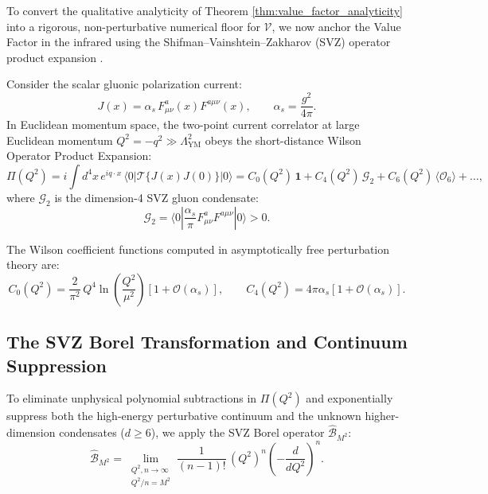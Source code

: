 To convert the qualitative analyticity of Theorem \ref{thm:value_factor_analyticity} into a rigorous, non-perturbative numerical floor for $\mathcal{V}$, we now anchor the Value Factor in the infrared using the Shifman--Vainshtein--Zakharov (SVZ) operator product expansion \cite{ShifmanVainshteinZakharov1979}.

Consider the scalar gluonic polarization current:
\begin{equation}
\label{eq:ch9_gluon_current}
J(x) = \alpha_s \, F_{\mu\nu}^a(x) F^{a\mu\nu}(x), \qquad \alpha_s = \frac{g^2}{4\pi}.
\end{equation}
In Euclidean momentum space, the two-point current correlator at large Euclidean momentum $Q^2 = -q^2 \gg \Lambda_{\mathrm{YM}}^2$ obeys the short-distance Wilson Operator Product Expansion:
\begin{equation}
\label{eq:ch9_ope_expansion}
\Pi(Q^2) = i \int d^4x \, e^{i q \cdot x} \, \langle 0 | \mathcal{T}\{ J(x) J(0) \} | 0 \rangle = C_0(Q^2) \, \mathbf{1} + C_4(Q^2) \, \mathcal{G}_2 + C_6(Q^2) \, \langle \mathcal{O}_6 \rangle + \dots,
\end{equation}
where $\mathcal{G}_2$ is the dimension-4 SVZ gluon condensate:
\begin{equation}
\label{eq:ch9_gluon_condensate_def}
\mathcal{G}_2 = \langle 0 | \frac{\alpha_s}{\pi} F_{\mu\nu}^a F^{a\mu\nu} | 0 \rangle > 0.
\end{equation}

The Wilson coefficient functions computed in asymptotically free perturbation theory are:
\begin{equation}
C_0(Q^2) = \frac{2}{\pi^2} \, Q^4 \ln\left(\frac{Q^2}{\mu^2}\right) \left[ 1 + \mathcal{O}(\alpha_s) \right], \qquad C_4(Q^2) = 4\pi \alpha_s \left[ 1 + \mathcal{O}(\alpha_s) \right].
\end{equation}

\subsection{The SVZ Borel Transformation and Continuum Suppression}
\label{subsec:svz_borel_transform}

To eliminate unphysical polynomial subtractions in $\Pi(Q^2)$ and exponentially suppress both the high-energy perturbative continuum and the unknown higher-dimension condensates ($d \ge 6$), we apply the SVZ Borel operator $\hat{\mathcal{B}}_{M^2}$:
\begin{equation}
\label{eq:ch9_borel_operator_def}
\hat{\mathcal{B}}_{M^2} = \lim_{\substack{Q^2, n \to \infty \\ Q^2/n = M^2}} \frac{1}{(n-1)!} \, (Q^2)^n \left( -\frac{d}{dQ^2} \right)^n.
\end{equation}

